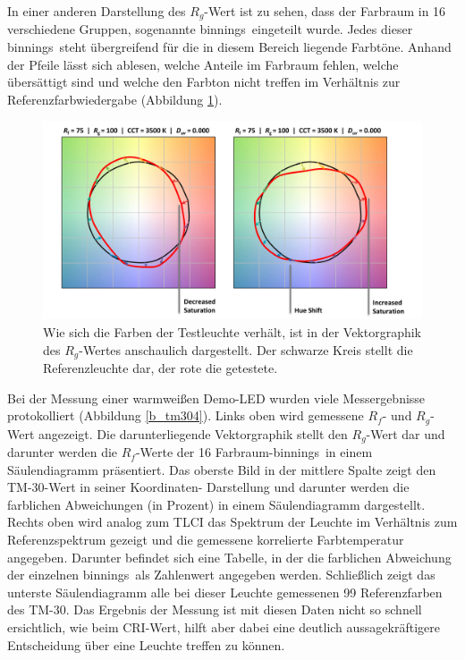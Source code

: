 \noindent In einer anderen Darstellung des $R_{g}$-Wert ist zu sehen, dass der Farbraum in 16 verschiedene Gruppen, sogenannte \glqq binnings\grqq\ eingeteilt wurde. Jedes dieser \glqq binnings\grqq\ steht übergreifend für die in diesem Bereich liegende Farbtöne. Anhand der Pfeile lässt sich ablesen, welche Anteile im Farbraum fehlen, welche übersättigt sind und welche den Farbton nicht treffen im Verhältnis zur Referenzfarbwiedergabe (Abbildung \ref{b_tm303}).

\begin{figure}[H]     %
\centering
\includegraphics[width=1.0\textwidth]{bilder/tm303} 
\caption {Wie sich die Farben der Testleuchte verhält, ist in der Vektorgraphik des $R_{g}$-Wertes anschaulich dargestellt. Der schwarze Kreis stellt die Referenzleuchte dar, der rote die getestete\protect\footnotemark .}\label{b_tm303}
\end{figure}

\noindent Bei der Messung einer warmweißen Demo-LED wurden viele Messergebnisse protokolliert (Abbildung \ref{b_tm304}). Links oben wird gemessene $R_{f}$- und $R_{g}$-Wert angezeigt. Die darunterliegende Vektorgraphik stellt den $R_{g}$-Wert dar und darunter werden die $R_{f}$-Werte der 16 Farbraum-\glqq binnings\grqq\  in einem Säulendiagramm präsentiert. Das oberste Bild in der mittlere Spalte zeigt den TM-30-Wert in seiner Koordinaten- Darstellung und darunter werden die farblichen Abweichungen (in Prozent) in einem Säulendiagramm dargestellt. Rechts oben wird analog zum TLCI das Spektrum der Leuchte im Verhältnis zum Referenzspektrum gezeigt und die gemessene korrelierte Farbtemperatur angegeben. Darunter befindet sich eine Tabelle, in der die farblichen Abweichung der einzelnen \glqq binnings\grqq\ als Zahlenwert angegeben werden. Schließlich zeigt das unterste Säulendiagramm alle bei dieser Leuchte gemessenen 99 Referenzfarben des TM-30. 
Das Ergebnis der Messung ist mit diesen Daten nicht so schnell ersichtlich, wie beim CRI-Wert, hilft aber dabei eine deutlich aussagekräftigere Entscheidung über eine Leuchte treffen zu können. 

